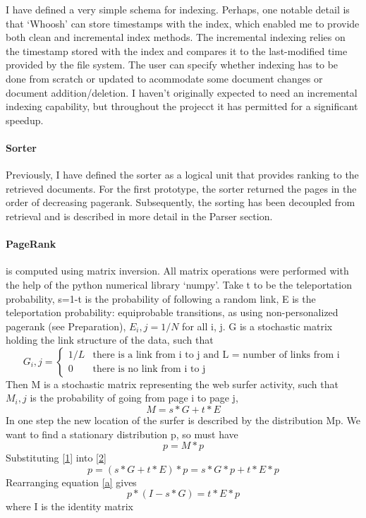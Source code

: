 \documentclass[12pt,twoside,notitlepage]{report}
\begin{document}
I have defined a very simple schema for indexing. Perhaps, one notable detail
is that `Whoosh' can store timestamps with the index, which enabled me to
provide both clean and incremental index methods. The incremental indexing
relies on the timestamp stored with the index and compares it to the
last-modified time provided by the file system. The user can specify whether
indexing has to be done from scratch or updated to acommodate some document
changes or document addition/deletion. I haven't originally expected to need an
incremental indexing capability, but throughout the projecct it has permitted
for a significant speedup.

\paragraph{Sorter}
Previously, I have defined the sorter as a logical unit that provides ranking to the
retrieved documents. For the first prototype, the sorter returned the pages in
the order of decreasing pagerank.
Subsequently, the sorting has been decoupled from retrieval and is described in
more detail in the Parser section.

\paragraph{PageRank} is computed using matrix inversion. All matrix operations
were performed with the help of the python numerical library `numpy'.  Take t
to be the teleportation probability, s=1-t is the probability of following a
random link, E is the teleportation probability: equiprobable transitions, as
using non-personalized pagerank (see Preparation), \(E_i,j = 1/N\) for all i,
j. G is a stochastic matrix holding the link structure of the data, such that 
\begin{equation*}
  G_i,j = \begin{cases}
    1/L & \text{there is a link from i to j and L = number of links from i}\\
    0   & \text{there is no link from i to j}
  \end{cases}
\end{equation*}
Then M is a stochastic matrix representing the web surfer activity, such
that \(M_i,j\) is the probability of going from page i to page j, 
\begin{equation} \label{1}
  M = s*G +t*E
\end{equation}
In one step the new location of the surfer is described by the distribution Mp.
We want to find a stationary distribution p, so must have
\begin{equation}\label{2}
  p = M*p
\end{equation}
Substituting \ref{1} into \ref{2}
\begin{equation} \label{a}
  p = (s*G+t*E)*p = s*G*p + t*E*p
\end{equation}
Rearranging equation \ref{a} gives
\begin{equation}
  p*(I-s*G) = t*E*p
\end{equation}
where I is the identity matrix
\end{document}
